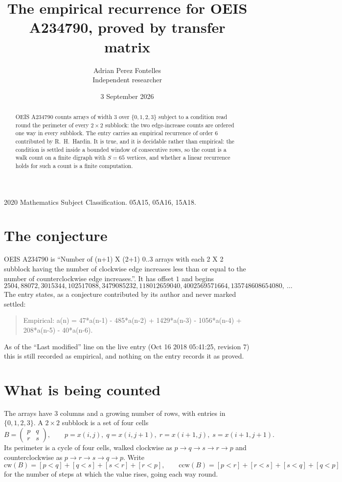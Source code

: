 \documentclass[11pt,a4paper]{article}
\title{The empirical recurrence for OEIS A234790, proved by transfer matrix}
\author{Adrian Perez Fontelles\\ \small Independent researcher}
\date{3 September 2026}
\theoremstyle{plain}
\theoremstyle{definition}
\begin{document}
\maketitle

\begin{abstract}
OEIS A234790 counts arrays of width $3$ over $\{0,1,2,3\}$ subject to a condition read round the
perimeter of every $2\times2$ subblock: the two edge-increase counts are ordered one way in every subblock. The entry carries an empirical recurrence of
order $6$ contributed by R.~H.~Hardin. It is true, and it is decidable rather than
empirical: the condition is settled inside a bounded window of consecutive rows, so the
count is a walk count on a finite digraph with $S=65$ vertices, and whether a linear
recurrence holds for such a count is a finite computation.
\end{abstract}

\noindent\small 2020 Mathematics Subject Classification. 05A15, 05A16, 15A18.\normalsize

\section{The conjecture}

OEIS A234790 is ``Number of (n+1) X (2+1) 0..3 arrays with each 2 X 2 subblock having the number of clockwise edge increases less than or equal to the number of counterclockwise edge increases.''. It has offset $1$ and begins
\[
2504, 88072, 3015344, 102517088, 3479085232, 118012659040, 4002569571664, 135748608654080,\ \dots
\]
The entry states, as a conjecture contributed by its author and never marked settled:
\begin{quote}
Empirical: a(n) = 47*a(n-1) - 485*a(n-2) + 1429*a(n-3) - 1056*a(n-4) + 208*a(n-5) - 40*a(n-6).
\end{quote}
As of the ``Last modified'' line on the live entry (Oct 16 2018 05:41:25, revision 7) this is still
recorded as empirical, and nothing on the entry records it as proved.

\section{What is being counted}

The arrays have $3$ columns and a growing number of rows, with entries in $\{0,1,2,3\}$. A
$2\times2$ subblock is a set of four cells
\[
B=\begin{pmatrix} p & q \\ r & s \end{pmatrix},
\qquad p=x(i,j),\; q=x(i,j+1),\; r=x(i+1,j),\; s=x(i+1,j+1).
\]
Its perimeter is a cycle of four cells, walked clockwise as $p\to q\to s\to r\to p$ and
counterclockwise as $p\to r\to s\to q\to p$. Write
\[
\mathrm{cw}(B)=[p<q]+[q<s]+[s<r]+[r<p],\qquad
\mathrm{ccw}(B)=[p<r]+[r<s]+[s<q]+[q<p]
\]
for the number of steps at which the value rises, going each way round.
\end{document}
